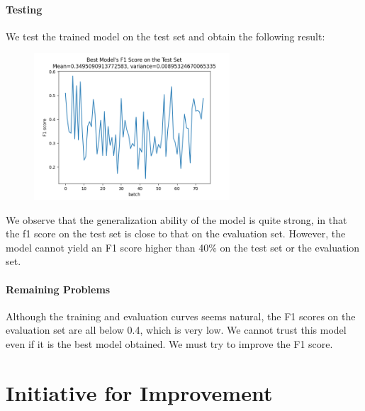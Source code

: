 \documentclass{article}
\begin{document}
\paragraph*{Testing}
We test the trained model on the test set and obtain the following result:
\begin{figure}[H]
    \centering
    \includegraphics[width=0.65\textwidth,height=0.45\textwidth]{test.png}
\end{figure}
We observe that the generalization ability of the model is quite strong, in that the 
f1 score on the test set is close to that on the evaluation set. 
However, the model cannot yield an F1 score higher than 40\% on the test set or the evaluation set. 

\paragraph*{Remaining Problems}
Although the training and evaluation curves seems natural, the F1 scores on 
the evaluation set are all below 0.4, which is very low. 
We cannot trust this model even if it is the best model obtained.
We must try to improve the F1 score. 

\section{Initiative for Improvement}
\end{document}
